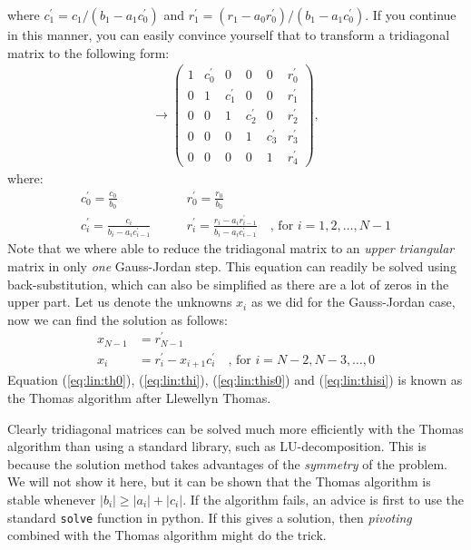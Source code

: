 \documentclass[graybox,sectrefs,envcountresetchap,open=right,final]{svmonodo}
\newenvironment{graybox2admon}[1][]{
\begin{graybox2mdframed}[frametitle=#1]
}
{
\end{graybox2mdframed}
}
\begin{document}
where $c_1^\prime=c_1/(b_1-a_1c_0^\prime)$ and
$r_1^\prime=(r_1-a_0r_0^\prime)/(b_1-a_1c_0^\prime)$. If you continue
in this manner, you can easily convince yourself that to transform a
tridiagonal matrix to the following form:
\begin{align}
\to \left(
\begin{array}{ccccc|c}
1&c_0^\prime&0&0&0&r_0^\prime\\ 
0&1&c_1^\prime&0&0&r_1^\prime\\ 
0&0&1&c_2^\prime&0&r_2^\prime\\ 
0& 0&0&1&c_3^\prime&r_3^\prime\\ 
0& 0& 0&0&1&r_4^\prime
\end{array}
\right),
\end{align}
where:
\begin{align}
c_0^\prime =\frac{c_0}{b_0} \qquad &r_0^\prime=\frac{r_0}{b_0}
\label{eq:lin:th0} \\ 
c_i^\prime
=\frac{c_i}{b_i-a_ic_{i-1}^\prime}\qquad
&r_i^\prime=\frac{r_i-a_ir_{i-1}^\prime}{b_i-a_ic_{i-1}^\prime}
\quad\text{, for }i=1,2,\ldots,N-1\label{eq:lin:thi} 
\end{align}
Note that we where able to reduce the tridiagonal matrix to an \emph{upper
triangular} matrix in only \emph{one} Gauss-Jordan step. This equation can
readily be solved using back-substitution, which can also be
simplified as there are a lot of zeros in the upper part. Let us
denote the unknowns $x_i$ as we did for the Gauss-Jordan case, now we
can find the solution as follows:
\begin{align}
x_{N-1} & = r_{N-1}^\prime \label{eq:lin:this0} \\ 
x_i     & = r_i^\prime-x_{i+1}c_i^\prime\quad\text{, for } i=N-2,N-3,\ldots,0
\label{eq:lin:thisi}
\end{align}
Equation (\ref{eq:lin:th0}), (\ref{eq:lin:thi}), (\ref{eq:lin:this0})
and (\ref{eq:lin:thisi}) is known as the Thomas algorithm after
Llewellyn Thomas. 


\begin{graybox2admon}[Notice]
Clearly tridiagonal matrices can be solved much more efficiently with
the Thomas algorithm than
using a standard library, such as LU-decomposition. This is
because the solution method takes advantages of the \emph{symmetry} of the
problem. We will not show it here, but it can be shown that the Thomas
algorithm is stable whenever $|b_i|\ge |a_i|+|c_i|$. If the algorithm
fails, an advice is first to use the standard \texttt{solve} function in
python. If this gives a solution, then \emph{pivoting} combined with the
Thomas algorithm might do the trick.
\end{graybox2admon}
\end{document}
